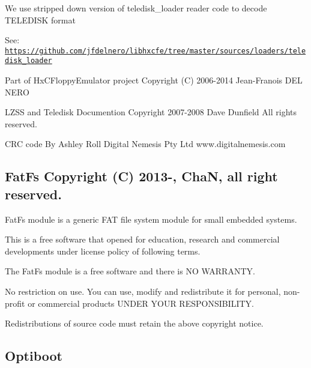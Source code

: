 \begin{DoxyItemize}
\item We use stripped down version of teledisk\+\_\+loader reader code to decode T\+E\+L\+E\+D\+I\+SK format
\begin{DoxyItemize}
\item See\+: \href{https://github.com/jfdelnero/libhxcfe/tree/master/sources/loaders/teledisk_loader}{\tt https\+://github.\+com/jfdelnero/libhxcfe/tree/master/sources/loaders/teledisk\+\_\+loader}
\begin{DoxyItemize}
\item Part of Hx\+C\+Floppy\+Emulator project Copyright (C) 2006-\/2014 Jean-\/\+Franois D\+EL N\+E\+RO
\item L\+Z\+SS and Teledisk Documention Copyright 2007-\/2008 Dave Dunfield All rights reserved.
\item C\+RC code By Ashley Roll Digital Nemesis Pty Ltd www.\+digitalnemesis.\+com 


\end{DoxyItemize}
\end{DoxyItemize}
\end{DoxyItemize}

\subsection*{Fat\+Fs Copyright (C) 2013-\/, ChaN, all right reserved.}

Fat\+Fs module is a generic F\+AT file system module for small embedded systems.

This is a free software that opened for education, research and commercial developments under license policy of following terms.


\begin{DoxyItemize}
\item The Fat\+Fs module is a free software and there is NO W\+A\+R\+R\+A\+N\+TY.
\item No restriction on use. You can use, modify and redistribute it for personal, non-\/profit or commercial products U\+N\+D\+ER Y\+O\+UR R\+E\+S\+P\+O\+N\+S\+I\+B\+I\+L\+I\+TY.
\item Redistributions of source code must retain the above copyright notice.
\end{DoxyItemize}





\subsection*{Optiboot}


